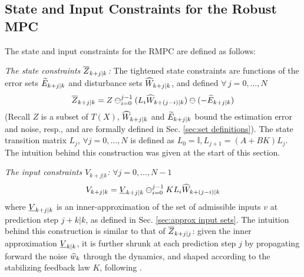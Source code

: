 \subsection{State and Input Constraints for the Robust MPC}
\label{sec:Constraints}
The state and input constraints for the RMPC are defined as follows:

\textit{The state constraints $\overline{Z}_{k+j|k}$:}
The tightened state constraints are functions of the error sets $\widetilde{E}_{k+j|k}$ and disturbance sets $\widehat{W}_{k+j|k}$, and defined $\forall\,j=0,\dotsc,N$
{\small{
\begin{equation} 
\label{eq:Set_constraints}
\overline{Z}_{k+j|k} = Z \ominus_{i=0}^{j-1}(L_i \widehat{W}_{k+(j-i)|k})\ominus (-\widetilde{E}_{k+j|k})
\end{equation}
}}
(Recall $Z$ is a subset of $T(X)$, $\widehat{W}_{k+j|k}$ and $\widetilde{E}_{k+j|k}$ bound the estimation error and noise, resp., and are formally defined in Sec. \ref{sec:set definitions}).
The state transition matrix $L_j$, $\forall j=0,\dotsc,N$   is defined as $L_0 = \mathbb{I}, L_{j+1} = (A+BK)L_j $.
The intuition behind this construction was given at the start of this section.

\textit{The input constraints $V_{k+j|k}$:}
$\forall j=0,...,N-1$
\begin{equation} 
\label{eq:input_constraints}
V_{k+j|k} = \underline{V}_{k+j|k} \ominus_{i=0}^{j-1}KL_i\widehat{W}_{k+(j-i)|k} 
\end{equation}
where $\underline{V}_{k+j|k} $ is an inner-approximation of the set of admissible inputs $v$ at prediction step $j+k|k$, as defined in Sec. \ref{sec:approx input sets}.
The intuition behind this construction is similar to that of $\overline{Z}_{k+j|j}$: given the inner approximation $\underline{V}_{k|k} $, it is further shrunk at each prediction step $j$ by propagating forward the noise $\widehat{w}_k$ through the dynamics, and shaped according to the stabilizing feedback law $K$, following \cite{RichardsH05_RMPC}.

